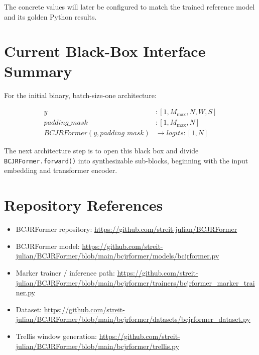 \documentclass[11pt,a4paper]{article}
\begin{document}
The concrete values will later be configured to match the trained reference
model and its golden Python results.

\section{Current Black-Box Interface Summary}

For the initial binary, batch-size-one architecture:

\[
\boxed{
\begin{aligned}
y &: [1,M_{\max},N,W,S] \\
padding\_mask &: [1,M_{\max},N] \\
BCJRFormer(y,padding\_mask) &\longrightarrow logits:[1,N]
\end{aligned}
}
\]

The next architecture step is to open this black box and divide
\texttt{BCJRFormer.forward()} into synthesizable sub-blocks, beginning with the
input embedding and transformer encoder.

\section{Repository References}

\begin{itemize}
    \item BCJRFormer repository:
    \url{https://github.com/streit-julian/BCJRFormer}
    \item BCJRFormer model:
    \url{https://github.com/streit-julian/BCJRFormer/blob/main/bcjrformer/models/bcjrformer.py}
    \item Marker trainer / inference path:
    \url{https://github.com/streit-julian/BCJRFormer/blob/main/bcjrformer/trainers/bcjrformer_marker_trainer.py}
    \item Dataset:
    \url{https://github.com/streit-julian/BCJRFormer/blob/main/bcjrformer/datasets/bcjrformer_dataset.py}
    \item Trellis window generation:
    \url{https://github.com/streit-julian/BCJRFormer/blob/main/bcjrformer/trellis.py}
\end{itemize}
\end{document}
